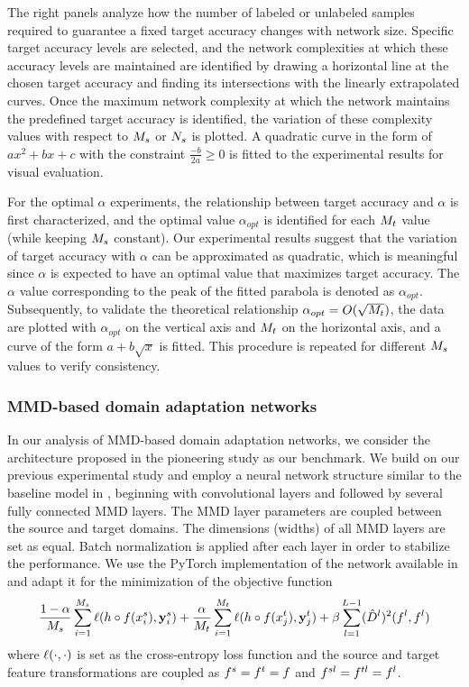 \documentclass[review,supplement,onefignum,onetabnum]{siamonline250211}
\begin{document}
The right panels analyze how the number of labeled or unlabeled samples required to guarantee a fixed target accuracy changes with network size. Specific target accuracy levels are selected, and the network complexities at which these accuracy levels are maintained are identified by drawing a horizontal line at the chosen target accuracy and finding its intersections with the linearly extrapolated curves. Once the maximum network complexity at which the network maintains the predefined target accuracy is identified, the variation of these complexity values with respect to $M_s$ or $N_s$ is plotted. A quadratic curve in the form of $ax^2 + bx + c$ with the constraint $\frac{-b}{2a} \geq 0$ is fitted to the experimental results for visual evaluation.

For the optimal $\alpha$ experiments, the relationship between target accuracy and $\alpha$ is first characterized, and the optimal value $\alpha_{opt}$ is identified for each $M_t$ value (while keeping $M_s$ constant). Our experimental results suggest that the variation of target accuracy with $\alpha$ can be approximated as quadratic, which is meaningful since $\alpha$ is expected to have an optimal value that maximizes target accuracy. The $\alpha$ value corresponding to the peak of the fitted parabola is denoted as $\alpha_{opt}$. Subsequently, to validate the theoretical relationship $\alpha_{opt} = O(\sqrt{M_t})$, the data are plotted with $\alpha_{opt}$ on the vertical axis and $M_t$ on the horizontal axis, and a curve of the form $a + b\sqrt{x}$ is fitted. This procedure is repeated for different $M_s$ values to verify consistency.

\subsubsection{MMD-based domain adaptation networks}

In our analysis of MMD-based domain adaptation networks, we consider the architecture proposed in the pioneering study \cite{LongCWJ15} as our benchmark. We build on our previous experimental study \cite{KaracaAAAAUV23} and employ a neural network structure similar to the baseline model in  \cite{LongCWJ15}, beginning with convolutional layers and followed by several fully connected MMD layers. The MMD layer parameters are coupled between the source and target domains. The dimensions (widths) of all MMD layers are set as equal. Batch normalization is applied after each layer in order to stabilize the performance. We use the PyTorch implementation of the network available in \cite{mmd_code_pytorch} and adapt it for the minimization of the objective function 
%
\begin{equation*}
 \frac{1-\alpha}{M_s} \sum_{i=1}^{M_s}  \ell( h \circ f(x^s_i), \mathbf{y}^s_i )  
+ \frac{\alpha}{M_t} \sum_{i=1}^{M_t} \ell( h \circ f(x^t_j),  \mathbf{y}^t_j  ) 
 +  \beta \sum_{l=1}^{L-1}  (\hat{D}^{l})^2 (f^l, f^l)
\end{equation*}
%
where $\ell(\cdot, \cdot)$ is set as the cross-entropy loss function and the source and target feature transformations are coupled as $f^s=f^t=f$ and $f^{sl}=f^{tl}=f^l$. 
\end{document}
